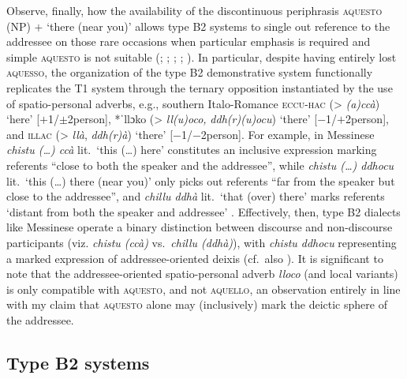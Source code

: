 \documentclass[output=paper]{langsci/langscibook}
\begin{document}
Observe, finally, how the availability of the discontinuous periphrasis
\textsc{aquesto} (NP) $+$ ‘there (near you)’ allows type B2 systems to
single out reference to the addressee on those rare occasions when particular
emphasis is required and simple \textsc{aquesto} is not suitable
(\citealt[74]{Parascandola:1976a}; \citealt[258]{Vann:1995a};
\citealt[102f]{ledgeway2004sviluppo}; \citealt[211]{Ledgeway:2009a};
\citealt[§5]{Jungbluth:2017a}). In particular, despite having
entirely lost \textsc{aquesso}, the organization of the type B2
demonstrative system functionally replicates the T1 system through the ternary
opposition instantiated by the use of spatio-personal adverbs, e.g., southern
Italo-Romance \textsc{eccu-hac} (> \emph{(a)ccà}) ‘here’ [$+$1/$\pm$2person], *ˈllɔko
(> \emph{ll(u)oco,} \emph{ddh(r)(u)ocu}) ‘there’ [$-$1/$+$2person], and
\textsc{illac} (> \emph{llà}, \emph{ddh(r)à}) ‘there’
[$-$1/$-$2person]. For example, in Messinese \emph{chistu
(\dots{}) ccà} lit.\ ‘this (\dots{}) here’ constitutes an inclusive expression
marking referents \enquote{close to both the speaker and the addressee}, while
\emph{chistu (\dots{}) ddhocu} lit.\ ‘this (\dots{}) there (near you)’ only
picks out referents \enquote{far from the speaker but close to the addressee},
and \emph{chillu ddhà} lit.\ ‘that (over) there’ marks referents ‘distant from
both the speaker and addressee’ \citep[30]{Quartarone:1998a}. Effectively,
then, type B2 dialects like Messinese operate a binary distinction
between discourse and non-discourse participants (viz. \emph{chistu (ccà)} vs.\
\emph{chillu (ddhà)}), with \emph{chistu ddhocu} representing a marked
expression of ad\-dress\-ee-ori\-ent\-ed \is{deixis}deix\-is (cf.\
also \citealt[76f]{Stavinschi:2009a}). It is significant to note that the
addressee-ori\-ent\-ed spatio-personal adverb \emph{lloco} (and local variants) is
only compatible with \textsc{aquesto}, and not \textsc{aquello}, an observation
entirely in line with my claim that \textsc{aquesto} alone may (inclusively)
mark the deictic sphere of the addressee.

\subsection{Type B2 systems}\label{sub:4.2}
\end{document}
